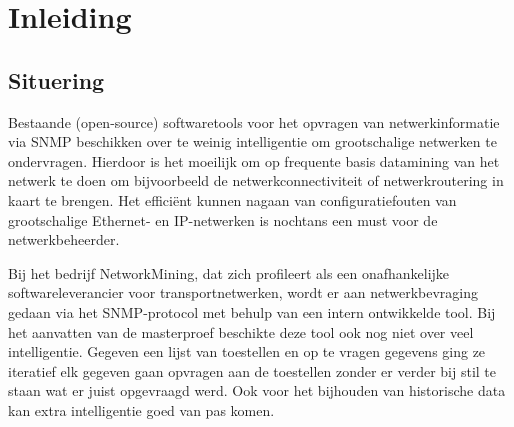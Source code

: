 

\chapter{Inleiding}


\section{Situering}
Bestaande (open-source) softwaretools voor het opvragen van netwerkinformatie via SNMP beschikken over te weinig intelligentie om
grootschalige netwerken te ondervragen.
Hierdoor is het moeilijk om op frequente basis datamining van het netwerk te doen om bijvoorbeeld de netwerkconnectiviteit of netwerkroutering in kaart te brengen.
Het efficiënt kunnen nagaan van configuratiefouten van grootschalige Ethernet- en IP-netwerken is nochtans een must voor de netwerkbeheerder.

Bij het bedrijf NetworkMining, dat zich profileert als een onafhankelijke softwareleverancier voor transportnetwerken, wordt er aan netwerkbevraging
gedaan via het SNMP-protocol met behulp van een intern ontwikkelde tool. Bij het aanvatten van de masterproef beschikte deze tool ook nog niet over veel intelligentie.
Gegeven een lijst van toestellen en op te vragen gegevens ging ze iteratief elk gegeven gaan opvragen aan de toestellen zonder
er verder bij stil te staan wat er juist opgevraagd werd.
Ook voor het bijhouden van historische data kan extra intelligentie goed van pas komen.


